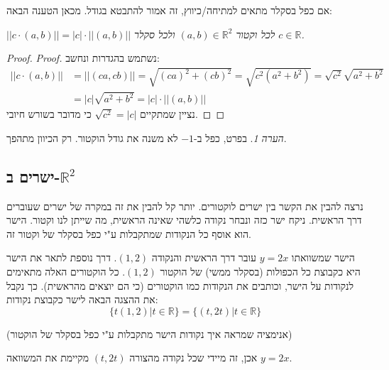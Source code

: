 \documentclass[
  hebrew,
  12pt,
  a4paper,
  oneside]{book}
\theoremstyle{definition}
\theoremstyle{remark}
\theoremstyle{plain}
\theoremstyle{remark}
\newtheorem*{remark}{הערה}
\begin{document}
אם כפל בסקלר מתאים למתיחה/כיווץ, זה אמור להתבטא בגודל. מכאן הטענה הבאה:

\begin{proposition}

\emph{\label{proposition:norm-scalar}
\(||c\cdot(a,b)||=|c|\cdot||(a,b)||\) לכל וקטור
\((a,b)\in\mathbb{R}^{2}\) ולכל סקלר \(c\in\mathbb{R}\).}

\end{proposition}

\begin{proof}
\emph{Proof.} נשתמש בהגדרות ונחשב: \[\begin{aligned}
||c\cdot(a,b)||&=||(ca,cb)||=\sqrt{(ca)^{2}+(cb)^{2}}=\sqrt{c^{2}(a^{2}+b^{2})}=\sqrt{c^2}\sqrt{a^2+b^2}\\
&=|c|\sqrt{a^{2}+b^{2}}=|c|\cdot||(a,b)||
\end{aligned}\] נציין שמתקיים \(\sqrt{c^2}=|c|\) כי מדובר בשורש חיובי.~◻
\end{proof}

\begin{remark}
בפרט, כפל ב-\(-1\) לא משנה את גודל הוקטור. רק הכיוון מתהפך.
\end{remark}

\subsection{\texorpdfstring{ישרים
ב-\(\mathbb{R}^{2}\)}{ישרים ב-\textbackslash mathbb\{R\}\^{}\{2\}}}\label{ux5d9ux5e9ux5e8ux5d9ux5dd-ux5d1-mathbbr2}

נרצה להבין את הקשר בין ישרים לוקטורים. יותר קל להבין את זה במקרה של
ישרים שעוברים דרך הראשית. ניקח ישר כזה ונבחר נקודה כלשהי שאינה הראשית,
מה שייתן לנו וקטור. הישר הוא אוסף כל הנקודות שמתקבלות ע"י כפל בסקלר של
וקטור זה.

\begin{example}

הישר שמשוואתו \(y=2x\) עובר דרך הראשית והנקודה \((1,2)\). דרך נוספת לתאר
את הישר היא כקבוצת כל הכפולות (בסקלר ממשי) של הוקטור \((1,2)\). כל
הוקטורים האלה מתאימים לנקודות על הישר, וכותבים את הנקודות כמו הוקטורים
(כי הם יוצאים מהראשית). כך נקבל את ההצגה הבאה לישר כקבוצת נקודות:
\[\{t(1,2)|t\in\mathbb{R}\}=\{(t,2t)|t\in\mathbb{R}\}\]

\end{example}

(אנימציה שמראה איך נקודות הישר מתקבלות ע"י כפל בסקלר של הוקטור)

אכן, זה מיידי שכל נקודה מהצורה \((t,2t)\) מקיימת את המשוואה \(y=2x\).
\end{document}
